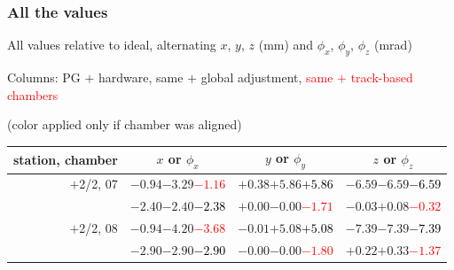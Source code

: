 \documentclass[compress]{beamer}
\begin{document}
\begin{frame}
\frametitle{All the values}
\tiny

All values relative to ideal, alternating $x$, $y$, $z$ (mm) and $\phi_x$, $\phi_y$, $\phi_z$ (mrad)

Columns: PG $+$ hardware, same $+$ global adjustment, \textcolor{red}{same $+$ track-based chambers}

\hfill (color applied only if chamber was aligned)

\vfill
\renewcommand{\arraystretch}{1.1}
\begin{tabular}{r | c | c | c}
station, chamber & $x$ or $\phi_x$ & $y$ or $\phi_y$ & $z$ or $\phi_z$ \\\hline
$+$2/2, 07 & $-0.94$\hspace{0.1 cm}$-3.29$\hspace{0.1 cm}\textcolor{red}{$-1.16$} & $+0.38$\hspace{0.1 cm}$+5.86$\hspace{0.1 cm}\textcolor{black}{$+5.86$} & $-6.59$\hspace{0.1 cm}$-6.59$\hspace{0.1 cm}\textcolor{black}{$-6.59$} \\
           & $-2.40$\hspace{0.1 cm}$-2.40$\hspace{0.1 cm}\textcolor{black}{$-2.38$} & $+0.00$\hspace{0.1 cm}$-0.00$\hspace{0.1 cm}\textcolor{red}{$-1.71$} & $-0.03$\hspace{0.1 cm}$+0.08$\hspace{0.1 cm}\textcolor{red}{$-0.32$} \\
$+$2/2, 08 & $-0.94$\hspace{0.1 cm}$-4.20$\hspace{0.1 cm}\textcolor{red}{$-3.68$} & $-0.01$\hspace{0.1 cm}$+5.08$\hspace{0.1 cm}\textcolor{black}{$+5.08$} & $-7.39$\hspace{0.1 cm}$-7.39$\hspace{0.1 cm}\textcolor{black}{$-7.39$} \\
           & $-2.90$\hspace{0.1 cm}$-2.90$\hspace{0.1 cm}\textcolor{black}{$-2.90$} & $-0.00$\hspace{0.1 cm}$-0.00$\hspace{0.1 cm}\textcolor{red}{$-1.80$} & $+0.22$\hspace{0.1 cm}$+0.33$\hspace{0.1 cm}\textcolor{red}{$-1.37$} \\

\end{tabular}
\end{frame}
\end{document}

